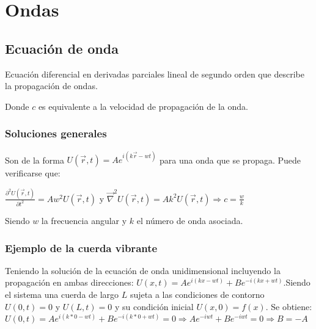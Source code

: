 \documentclass[oneside]{book}
\numberwithin{equation}{section}
\numberwithin{figure}{section}
\numberwithin{table}{section}
\begin{document}
	\chapter{Ondas}
		\section{Ecuación de onda}
			Ecuación diferencial en derivadas parciales lineal de segundo orden que describe la propagación de ondas.
			
			\begin{center}
			\end{center}
	
			Donde $c$ es equivalente a la velocidad de propagación de la onda.
			
			\subsection{Soluciones generales}
			
				Son de la forma $\displaystyle U(\vec{r},t)=Ae^{i(k\vec{r}-wt)}$ para una onda que se propaga. Puede verificarse que:\\
				
				\begin{center}
				$\displaystyle \frac{\partial^2 U(\vec{r},t)}{\partial t^2}=Aw^2U(\vec{r},t)$ y $\displaystyle \overrightarrow{\nabla}^2U(\vec{r},t)=Ak^2U(\vec{r},t) \Rightarrow c=\frac{w}{k}$
				\end{center}
				
				Siendo $w$ la frecuencia angular y $k$ el número de onda asociada.
			
			\subsection{Ejemplo de la cuerda vibrante}

				Teniendo la solución de la ecuación de onda unidimensional incluyendo la propagación en ambas direcciones: $\displaystyle U(x,t)=Ae^{i(kx-wt)}+Be^{-i(kx+wt)}$.Siendo el sistema una cuerda de largo $L$ sujeta a las condiciones de contorno $U(0,t)=0$ y $U(L,t)=0$ y su condición inicial $U(x,0)=f(x)$. Se obtiene:\\
				
				$\displaystyle U(0,t)=Ae^{i(k*0-wt)}+Be^{-i(k*0+wt)}=0 \Rightarrow Ae^{-iwt}+Be^{-iwt}=0 \Rightarrow B=-A$\\
				
\end{document}
